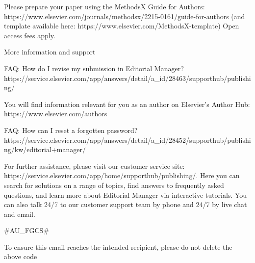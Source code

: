 Please prepare your paper using the MethodsX Guide for Authors: https://www.elsevier.com/journals/methodsx/2215-0161/guide-for-authors  (and template available here: https://www.elsevier.com/MethodsX-template) Open access fees apply.



More information and support 

FAQ: How do I revise my submission in Editorial Manager? 
https://service.elsevier.com/app/answers/detail/a_id/28463/supporthub/publishing/ 

You will find information relevant for you as an author on Elsevier’s Author Hub: https://www.elsevier.com/authors 

FAQ: How can I reset a forgotten password?
        https://service.elsevier.com/app/answers/detail/a_id/28452/supporthub/publishing/kw/editorial+manager/

For further assistance, please visit our customer service site: https://service.elsevier.com/app/home/supporthub/publishing/. Here you can search for solutions on a range of topics, find answers to frequently asked questions, and learn more about Editorial Manager via interactive tutorials. You can also talk 24/7 to our customer support team by phone and 24/7 by live chat and email. 

#AU_FGCS#

To ensure this email reaches the intended recipient, please do not delete the above code